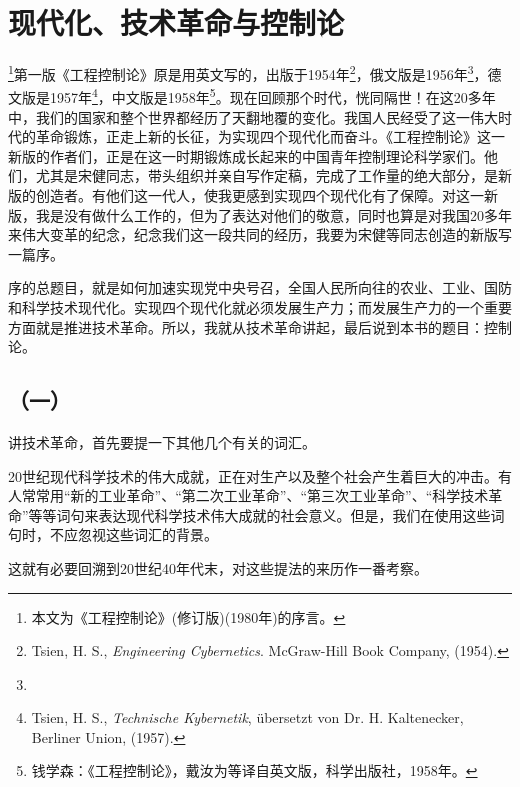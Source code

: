 
\chapter*{现代化、技术革命与控制论}

\footnote{本文为《工程控制论》(修订版)(1980年)的序言。}第一版《工程控制论》原是用英文写的，出版于1954年\footnote{Tsien, H. S., \textit{Engineering Cybernetics}. McGraw-Hill Book Company, (1954).}，俄文版是1956年\footnote{}，德文版是1957年\footnote{Tsien, H. S., \textit{Technische Kybernetik}, übersetzt von Dr. H. Kaltenecker, Berliner Union, (1957).}，中文版是1958年\footnote{钱学森：《工程控制论》，戴汝为等译自英文版，科学出版社，1958年。}。现在回顾那个时代，恍同隔世！在这20多年中，我们的国家和整个世界都经历了天翻地覆的变化。我国人民经受了这一伟大时代的革命锻炼，正走上新的长征，为实现四个现代化而奋斗。《工程控制论》这一新版的作者们，正是在这一时期锻炼成长起来的中国青年控制理论科学家们。他们，尤其是宋健同志，带头组织并亲自写作定稿，完成了工作量的绝大部分，是新版的创造者。有他们这一代人，使我更感到实现四个现代化有了保障。对这一新版，我是没有做什么工作的，但为了表达对他们的敬意，同时也算是对我国20多年来伟大变革的纪念，纪念我们这一段共同的经历，我要为宋健等同志创造的新版写一篇序。

序的总题目，就是如何加速实现党中央号召，全国人民所向往的农业、工业、国防和科学技术现代化。实现四个现代化就必须发展生产力；而发展生产力的一个重要方面就是推进技术革命。所以，我就从技术革命讲起，最后说到本书的题目：控制论。

\section*{（一）}
讲技术革命，首先要提一下其他几个有关的词汇。

20世纪现代科学技术的伟大成就，正在对生产以及整个社会产生着巨大的冲击。有人常常用“新的工业革命”、“第二次工业革命”、“第三次工业革命”、“科学技术革命”等等词句来表达现代科学技术伟大成就的社会意义。但是，我们在使用这些词句时，不应忽视这些词汇的背景。

这就有必要回溯到20世纪40年代末，对这些提法的来历作一番考察。

